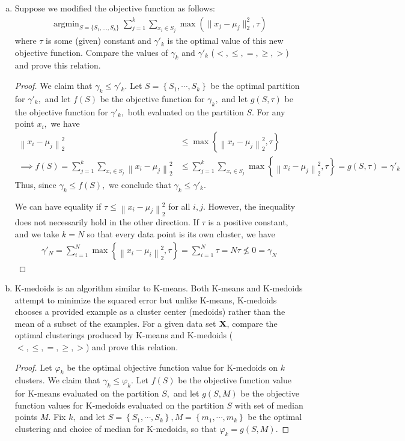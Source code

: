 \documentclass{article}
\newcommand{\X}{{\bf X}}
\begin{document}
\begin{enumerate}[(a)]
		\item Suppose we modified the objective function as follows:
			\begin{eqnarray}
				\mathop{\textrm{argmin}}_{S=\{S_1,...,S_k\}}\sum_{j=1}^k\sum_{x_i\in S_j}\max(\|x_j-\mu_j\|_2^2, \tau)
				\label{objective2}
			\end{eqnarray}
			where $\tau$ is some (given) constant and $\gamma'_k$ is the optimal value of this new objective function. Compare the values of 
			$\gamma_k$ and $\gamma'_k$ ($<, \le, =, \ge, >$) and prove this relation.
			\begin{proof}
				We claim that $\gamma_k \le \gamma'_k.$ Let $S=\left\{ S_1, \cdots, S_k \right\}$ be the optimal partition for $\gamma'_k,$ and let $f(S)$ be the objective function for $\gamma_k,$ and let $g(S, \tau)$ be the objective function for $\gamma'_k,$ both evaluated on the partition $S.$ For any point $x_i,$ we have
				\begin{align*}
					\left\lVert x_i-\mu_j \right\rVert_2^2 &\le \max\left\{ \left\lVert x_i-\mu_j \right\rVert_2^2, \tau \right\} \\
					\implies f(S) = \sum_{j=1}^{k} \sum_{x_i\in S_j}^{} \left\lVert x_i-\mu_j \right\rVert_2^2 &\le \sum_{j=1}^{k} \sum_{x_i\in S_j}^{} \max\left\{ \left\lVert x_i-\mu_j \right\rVert_2^2, \tau \right\} = g(S, \tau) = \gamma'_k
				\end{align*}
				Thus, since $\gamma_k\le f(S),$ we conclude that $\gamma_k\le \gamma'_k.$

				We can have equality if $\tau \le \left\lVert x_i-\mu_j \right\rVert_2^2$ for all $i, j.$ However, the inequality does not necessarily hold in the other direction. If $\tau$ is a positive constant, and we take $k=N$ so that every data point is its own cluster, we have
				\begin{align*}
					\gamma'_N = \sum_{i=1}^{N} \max\left\{ \left\lVert x_i-\mu_i \right\rVert_2^2, \tau \right\} = \sum_{i=1}^{N} \tau = N\tau \not\le 0 = \gamma_N
				\end{align*}
			\end{proof}

		\item K-medoids is an algorithm similar to K-means. Both K-means and K-medoids attempt to minimize the squared error but unlike K-means, K-medoids chooses a provided example as a cluster center (medoids) rather than the mean of a subset of the examples. For a given data set $\X$, compare the optimal clusterings produced by K-means and K-medoids ($<, \le, =, \ge, >$) and prove this relation.
			\begin{proof}
				Let $\varphi_k$ be the optimal objective function value for K-medoids on $k$ clusters. We claim that $\gamma_k\le \varphi_k.$ Let $f(S)$ be the objective function value for K-means evaluated on the partition $S,$ and let $g(S, M)$ be the objective function values for K-medoids evaluated on the partition $S$ with set of median points $M.$ Fix $k,$ and let $S=\left\{ S_1, \cdots, S_k \right\}, M=\left\{ m_1, \cdots, m_k \right\}$ be the optimal clustering and choice of median for K-medoids, so that $\varphi_k=g(S, M).$
				

\end{proof}
\end{enumerate}
\end{document}
